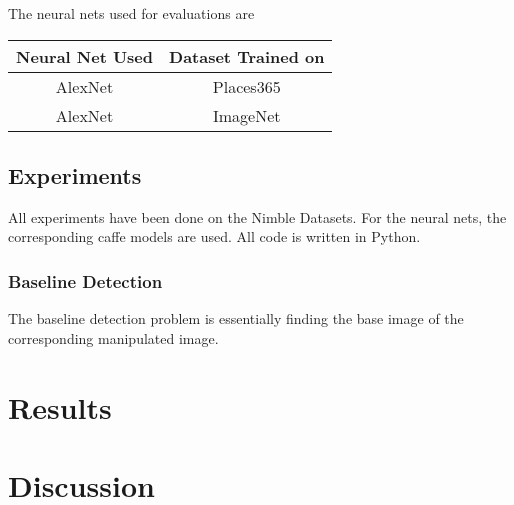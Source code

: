 \documentclass{article}
\begin{document}
The neural nets used for evaluations are
\begin{center}
  \begin{tabular}{|c|c|}
    \hline
    Neural Net Used & Dataset Trained on \\
    \hline
    AlexNet & Places365 \\
    \hline
    AlexNet & ImageNet \\
    \hline
  \end{tabular}
\end{center}
\subsection{Experiments}
All experiments have been done on the Nimble Datasets. For the neural nets, the corresponding caffe models are used. All code is written in Python.
\subsubsection{Baseline Detection}
The baseline detection problem is essentially finding the base image of the corresponding manipulated image.


\section{Results}
\section{Discussion}
\end{document}
